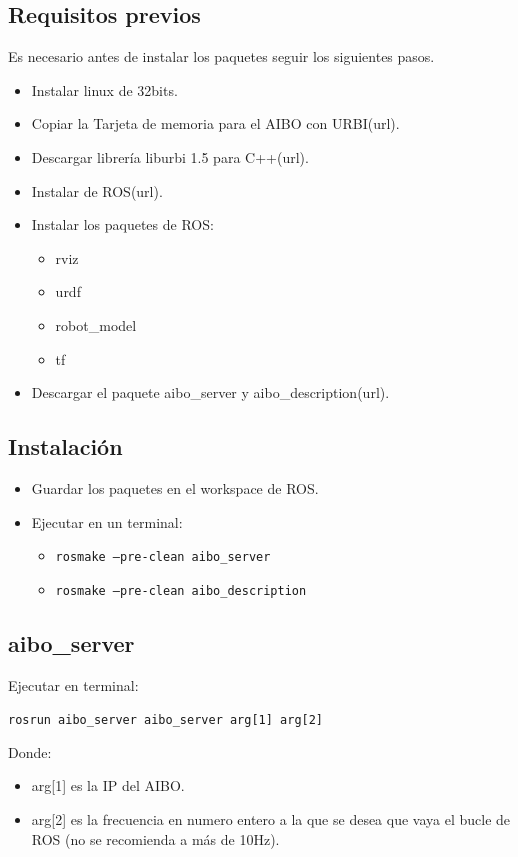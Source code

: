 \documentclass[12pt,a4paper,final,twoside]{article}
\begin{document}
\subsection{Requisitos previos}
Es necesario antes de instalar los paquetes seguir los siguientes pasos.
\begin{itemize}
\item Instalar linux de 32bits.
\item Copiar la Tarjeta de memoria para el AIBO con URBI(url).
\item Descargar librería liburbi 1.5 para C++(url).
\item Instalar de ROS(url).
\item Instalar los paquetes de ROS:
\begin{itemize}
\item rviz
\item urdf
\item robot{\_}model
\item tf
\end{itemize}
\item Descargar el paquete aibo{\_}server y aibo{\_}description(url).
\end{itemize}
\subsection{Instalación}
\begin{itemize}
\item Guardar los paquetes en el workspace de ROS.
\item Ejecutar en un terminal:
\begin{itemize}
\item \texttt{rosmake --pre-clean aibo{\_}server} 
\item \texttt{rosmake --pre-clean aibo{\_}description}
\end{itemize}
\end{itemize}
\subsection{aibo{\_}server}
Ejecutar en terminal:

\texttt{rosrun aibo{\_}server aibo{\_}server arg[1] arg[2]}

Donde:
\begin{itemize}
\item arg[1] es la IP del AIBO.
\item arg[2] es la frecuencia en numero entero a la que se desea que vaya el bucle de ROS (no se recomienda a más de 10Hz).
\end{itemize}
\end{document}
